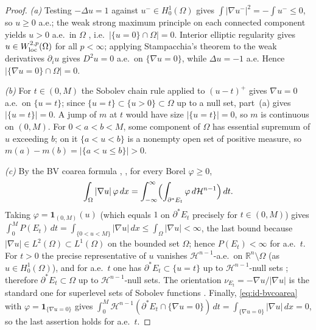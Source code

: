 \documentclass[11pt]{amsart}
\theoremstyle{definition}
\newcommand{\R}{\mathbb R}
\newcommand{\Om}{\Omega}
\newcommand{\Hn}{\mathcal H^{n-1}}
\newcommand{\Per}{P}
\begin{document}
\begin{proof}
\emph{(a)} Testing \(-\Delta u=1\) against \(u^-\in H^1_0(\Om)\) gives
\(\int|\nabla u^-|^2=-\int u^-\le0\), so \(u\ge0\) a.e.; the weak strong maximum
principle on each connected component yields \(u>0\) a.e.\ in \(\Om\)
\cite{GilbargTrudinger2001}, i.e.\ \(|\{u=0\}\cap\Om|=0\).  Interior elliptic
regularity gives \(u\in W^{2,p}_{\rm loc}(\Om)\) for all \(p<\infty\); applying
Stampacchia's theorem \cite{Stampacchia1965} to the weak derivatives
\(\partial_iu\) gives \(D^2u=0\) a.e.\ on \(\{\nabla u=0\}\), while
\(\Delta u=-1\) a.e.  Hence \(|\{\nabla u=0\}\cap\Om|=0\).

\emph{(b)} For \(t\in(0,M)\) the Sobolev chain rule applied to \((u-t)^+\) gives
\(\nabla u=0\) a.e.\ on \(\{u=t\}\); since \(\{u=t\}\subset\{u>0\}\subset\Om\) up
to a null set, part~(a) gives \(|\{u=t\}|=0\).  A jump of \(m\) at \(t\) would
have size \(|\{u=t\}|=0\), so \(m\) is continuous on \((0,M)\).  For
\(0<a<b<M\), some component of \(\Om\) has essential supremum of \(u\) exceeding
\(b\); on it \(\{a<u<b\}\) is a nonempty open set of positive measure, so
\(m(a)-m(b)=|\{a<u\le b\}|>0\).

\emph{(c)} By the BV coarea formula \cite[Thm.~13.1]{Maggi2012},
\cite[Thm.~3.40]{AFP2000}, for every Borel \(\varphi\ge0\),
\begin{equation}\label{eq:id-bvcoarea}
   \int_\Om|\nabla u|\,\varphi\,dx
   =\int_{-\infty}^{\infty}\Bigl(\int_{\partial^*E_t}\varphi\,d\Hn\Bigr)\,dt .
\end{equation}
Taking \(\varphi=\mathbf 1_{(0,M)}(u)\) (which equals \(1\) on
\(\partial^*E_t\) precisely for \(t\in(0,M)\)) gives
\(\int_0^M\Per(E_t)\,dt=\int_{\{0<u<M\}}|\nabla u|\,dx\le\int_\Om|\nabla u|
<\infty\), the last bound because \(|\nabla u|\in L^2(\Om)\subset L^1(\Om)\) on
the bounded set \(\Om\); hence \(\Per(E_t)<\infty\) for a.e.\ \(t\).  For \(t>0\) the precise representative of
\(u\) vanishes \(\Hn\)-a.e.\ on \(\R^n\setminus\Om\) (as \(u\in H^1_0(\Om)\)),
and for a.e.\ \(t\) one has \(\partial^*E_t\subset\{u=t\}\) up to \(\Hn\)-null
sets \cite{AFP2000,Maggi2012}; therefore \(\partial^*E_t\subset\Om\) up to
\(\Hn\)-null sets.  The orientation \(\nu_{E_t}=-\nabla u/|\nabla u|\) is the
standard one for superlevel sets of Sobolev functions \cite{AFP2000}.  Finally,
\eqref{eq:id-bvcoarea} with \(\varphi=\mathbf 1_{\{\nabla u=0\}}\) gives
\(\int_0^M\Hn(\partial^*E_t\cap\{\nabla u=0\})\,dt
=\int_{\{\nabla u=0\}}|\nabla u|\,dx=0\), so the last assertion holds for a.e.\
\(t\).
\end{proof}
\end{document}
